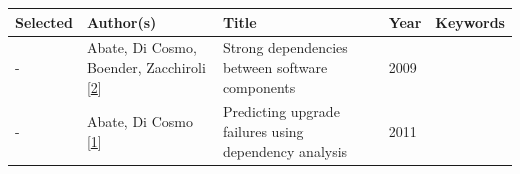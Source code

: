\documentclass[]{book}
\begin{document}
\begin{longtable}[]{@{}lllll@{}}
\toprule
\begin{minipage}[b]{0.01\columnwidth}\raggedright\strut
Selected\strut
\end{minipage} & \begin{minipage}[b]{0.09\columnwidth}\raggedright\strut
Author(s)\strut
\end{minipage} & \begin{minipage}[b]{0.34\columnwidth}\raggedright\strut
Title\strut
\end{minipage} & \begin{minipage}[b]{0.02\columnwidth}\raggedright\strut
Year\strut
\end{minipage} & \begin{minipage}[b]{0.39\columnwidth}\raggedright\strut
Keywords\strut
\end{minipage}\tabularnewline
\midrule
\endhead
\begin{minipage}[t]{0.01\columnwidth}\raggedright\strut
-\strut
\end{minipage} & \begin{minipage}[t]{0.09\columnwidth}\raggedright\strut
Abate, Di Cosmo, Boender, Zacchiroli
{[}\protect\hyperlink{ref-Abate2009}{2}{]}\strut
\end{minipage} & \begin{minipage}[t]{0.34\columnwidth}\raggedright\strut
Strong dependencies between software components\strut
\end{minipage} & \begin{minipage}[t]{0.02\columnwidth}\raggedright\strut
2009\strut
\end{minipage} & \begin{minipage}[t]{0.39\columnwidth}\raggedright\strut
\strut
\end{minipage}\tabularnewline
\begin{minipage}[t]{0.01\columnwidth}\raggedright\strut
-\strut
\end{minipage} & \begin{minipage}[t]{0.09\columnwidth}\raggedright\strut
Abate, Di Cosmo {[}\protect\hyperlink{ref-Abate2011}{1}{]}\strut
\end{minipage} & \begin{minipage}[t]{0.34\columnwidth}\raggedright\strut
Predicting upgrade failures using dependency analysis\strut
\end{minipage} & \begin{minipage}[t]{0.02\columnwidth}\raggedright\strut
2011\strut
\end{minipage} & \begin{minipage}[t]{0.39\columnwidth}\raggedright\strut

\end{minipage}
\end{longtable}
\end{document}
